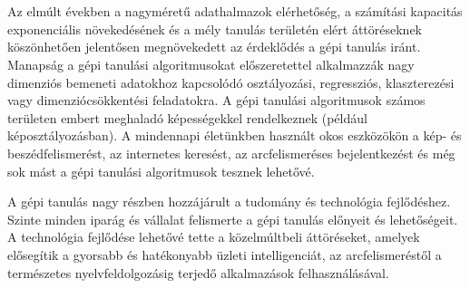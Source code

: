 \section{\bevezetes}


Az elmúlt években a nagyméretű adathalmazok elérhetőség, a számítási kapacitás exponenciális növekedésének és a mély tanulás területén elért áttöréseknek köszönhetően jelentősen megnövekedett az érdeklődés a gépi tanulás iránt. Manapság a gépi tanulási algoritmusokat előszeretettel alkalmazzák nagy dimenziós bemeneti adatokhoz kapcsolódó osztályozási, regressziós, klaszterezési vagy dimenziócsökkentési feladatokra. A gépi tanulási algoritmusok számos területen embert meghaladó képességekkel rendelkeznek (például képosztályozásban). A mindennapi életünkben használt okos eszközökön a kép- és beszédfelismerést, az internetes keresést, az arcfelismeréses bejelentkezést és még sok mást a gépi tanulási algoritmusok tesznek lehetővé.


A gépi tanulás nagy részben hozzájárult a tudomány és technológia fejlődéshez. Szinte minden iparág és vállalat felismerte a gépi tanulás előnyeit és lehetőségeit. A technológia fejlődése lehetővé tette a közelmúltbeli áttöréseket, amelyek elősegítik a gyorsabb és hatékonyabb üzleti intelligenciát, az arcfelismeréstől a természetes nyelvfeldolgozásig terjedő alkalmazások felhasználásával.


